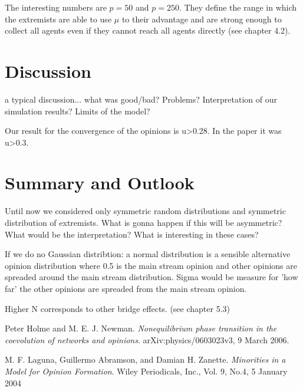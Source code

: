 \documentclass[11pt]{article}
\begin{document}
The interesting numbers are $p = 50$ and $p = 250$. They define the range in which the extremists are able to use $\mu$ to their advantage and are strong enough to collect all agents even if they cannot reach all agents directly (see chapter 4.2).


\section{Discussion}
a typical discussion... what was good/bad? Problems? Interpretation of our simulation results? Limits of the model?

Our result for the convergence of the opinions is u>0.28. In the paper it was u>0.3.

\section{Summary and Outlook}
Until now we considered only symmetric random distributions and symmetric distribution of extremists. What is gonna happen if this will be asymmetric? What would be the interpretation? What is interesting in these cases?


If we do no Gaussian distribtion: a normal distribution is a sensible alternative opinion distribution where 0.5 is the main stream opinion and other opinions are spreaded around the main stream distribution. Sigma would be measure for 'how far' the other opinions are spreaded from the main stream opinion.

Higher N corresponds to other bridge effects. (see chapter 5.3)


\begin{thebibliography}{99}
 Peter Holme and M. E. J. Newman. \textit{Nonequilibrium phase transition in the coevolution of networks and opinions}. arXiv:physics/0603023v3, 9 March 2006.

 M. F. Laguna, Guillermo Abramson, and Damian H. Zanette. \textit{Minorities in a Model for Opinion Formation}. Wiley Periodicals, Inc., Vol. 9, No.4, 5 January 2004

\end{thebibliography} 
\end{document}
